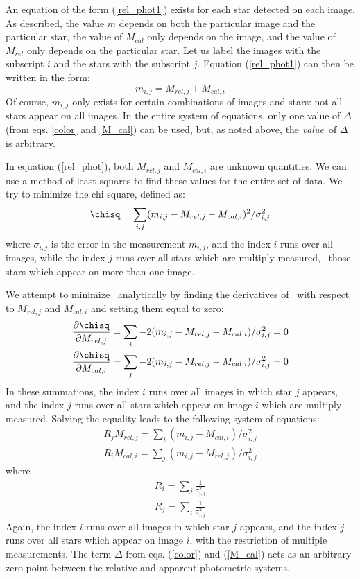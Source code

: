 \documentclass{article}
\begin{document}
        An equation of the form (\ref{rel_phot1}) exists for each star
detected on each image.  As described, the value $m$ depends on both
the particular image and the particular star, the value of $M_{cal}$
only depends on the image, and the value of $M_{rel}$ only depends on
the particular star.  Let us label the images with the subscript $i$
and the stars with the subscript $j$.  Equation (\ref{rel_phot1}) can
then be written in the form:
\begin{equation}
m_{i,j} = M_{rel,j} + M_{cal,i} \label{rel_phot}
\end{equation}
Of course, $m_{i,j}$ only exists for certain combinations of images
and stars: not all stars appear on all images.  In the entire system
of equations, only one value of $\Delta$ (from eqs. \ref{color} and
\ref{M_cal}) can be used, but, as noted above, the {\em value}\ of
$\Delta$ is arbitrary.

        In equation (\ref{rel_phot}), both $M_{rel,j}$ and $M_{cal,i}$
are unknown quantities.  We can use a method of least squares to find
these values for the entire set of data.  We try to minimize the chi
square, defined as:
\begin{equation}
\chisq = \sum_{i,j}(m_{i,j} - M_{rel,j} - M_{cal,i})^2 / \sigma_{i,j}^2 \label{chisquare}
\end{equation}
where $\sigma_{i,j}$ is the error in the measurement $m_{i,j}$, and
the index $i$ runs over all images, while the index $j$ runs over all
stars which are multiply measured, \ie\ those stars which appear on more
than one image.

        We attempt to minimize \chisq\ analytically by finding the
derivatives of \chisq\ with respect to $M_{rel,j}$ and $M_{cal,i}$
and setting them equal to zero:
\begin{eqnarray}
\frac{\partial\chisq}{\partial M_{rel,j}} = \sum_{i}-2(m_{i,j} -
M_{rel,j} - M_{cal,i}) / \sigma_{i,j}^2 = 0  \nonumber \\
\frac{\partial\chisq}{\partial M_{cal,i}} = \sum_{j}-2(m_{i,j} -
M_{rel,j} - M_{cal,i}) / \sigma_{i,j}^2 = 0
\end{eqnarray}
In these summations, the index $i$ runs over all images in which star
$j$ appears, and the index $j$ runs over all stars which appear on
image $i$ which are multiply measured.  Solving the equality leads to
the following system of equations:
\begin{eqnarray}
R_{j}M_{rel,j} = \sum_{i}(m_{i,j} - M_{cal,i}) / \sigma_{i,j}^2 \label{system1} \\
R_{i}M_{cal,i} = \sum_{j}(m_{i,j} - M_{rel,j}) / \sigma_{i,j}^2 \label{system2}
\end{eqnarray}
where 
\begin{eqnarray}
R_{i} = \sum_{j}\frac{1}{\sigma_{i,j}^2} \nonumber \\
R_{j} = \sum_{i}\frac{1}{\sigma_{i,j}^2} 
\end{eqnarray}
Again, the index $i$ runs over all images in which star $j$ appears,
and the index $j$ runs over all stars which appear on image $i$, with
the restriction of multiple measurements.  The term $\Delta$ from
eqs. (\ref{color}) and (\ref{M_cal}) acts as an arbitrary zero point
between the relative and apparent photometric systems.
\end{document}
